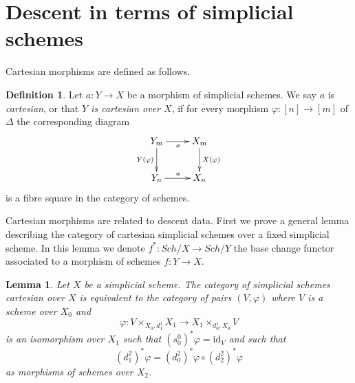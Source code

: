 \documentclass{stacks-project}
\theoremstyle{plain}
\newtheorem{lemma}[subsection]{Lemma}
\theoremstyle{definition}
\newtheorem{definition}[subsection]{Definition}
\theoremstyle{remark}
\numberwithin{equation}{subsection}
\def\Sch{\mathit{Sch}}
\begin{document}
\section{Descent in terms of simplicial schemes}
\label{section-simplicial-descent}

\noindent
Cartesian morphisms are defined as follows.

\begin{definition}
\label{definition-cartesian-morphism}
Let $a : Y \to X$ be a morphism of simplicial schemes.
We say $a$ is {\it cartesian}, or that {\it $Y$ is cartesian over $X$},
if for every morphism $\varphi : [n] \to [m]$ of $\Delta$ the corresponding
diagram
$$
\xymatrix{
Y_m \ar[r]_a \ar[d]_{Y(\varphi)} & X_m \ar[d]^{X(\varphi)}\\
Y_n \ar[r]^{a} & X_n
}
$$
is a fibre square in the category of schemes.
\end{definition}

\noindent
Cartesian morphisms are related to descent data. First we prove a general
lemma describing the category of cartesian simplicial schemes over a
fixed simplicial scheme. In this lemma we denote $f^* : \Sch/X \to \Sch/Y$
the base change functor associated to a morphism of schemes $f :Y \to X$.

\begin{lemma}
\label{lemma-characterize-cartesian-schemes}
Let $X$ be a simplicial scheme. The category of simplicial schemes cartesian
over $X$ is equivalent to the category of pairs $(V, \varphi)$
where $V$ is a scheme over $X_0$ and
$$
\varphi :
V \times_{X_0, d^1_1} X_1
\longrightarrow
X_1 \times_{d^1_0, X_0} V
$$
is an isomorphism over $X_1$ such that
$(s_0^0)^*\varphi = \text{id}_V$ and such that
$$
(d^2_1)^*\varphi = (d^2_0)^*\varphi \circ (d^2_2)^*\varphi
$$
as morphisms of schemes over $X_2$.
\end{lemma}
\end{document}
